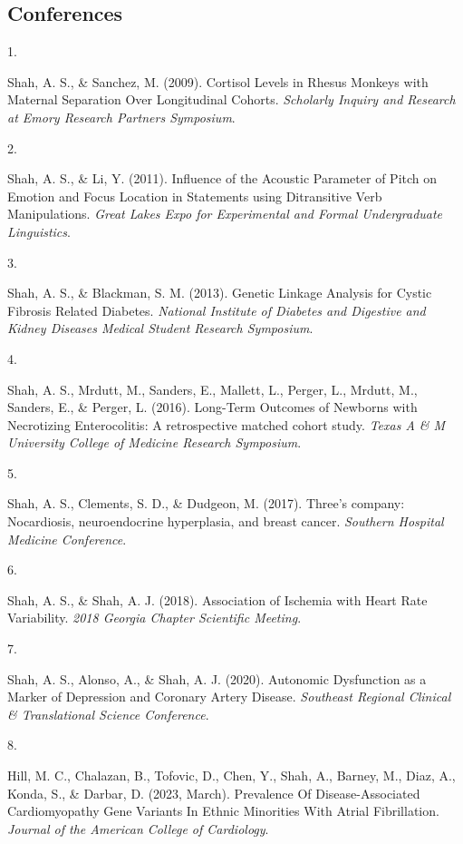 \documentclass[10pt,a4paper,]{article}
\newlength{\cslhangindent}
\newlength{\csllabelwidth}
\newenvironment{CSLReferences}[2] %
 {\begin{list}{}{%
  \setlength{\itemindent}{0pt}
  \setlength{\leftmargin}{0pt}
  \setlength{\parsep}{0pt}
  \ifodd #1
   \setlength{\leftmargin}{\cslhangindent}
   \setlength{\itemindent}{-1\cslhangindent}
  \fi
  \setlength{\itemsep}{#2\baselineskip}}}
 {\end{list}}
\newcommand{\CSLLeftMargin}[1]{\parbox[t]{\csllabelwidth}{\strut#1\strut}}
\newcommand{\CSLRightInline}[1]{\parbox[t]{\linewidth - \csllabelwidth}{\strut#1\strut}}
\begin{document}
\hypertarget{conferences}{%
\subsection{Conferences}\label{conferences}}

\hypertarget{refs-4fd2c6437df1f6e1a9355f0aa5a09fda}{}
\begin{CSLReferences}{0}{0}
\leavevmode{}%
\CSLLeftMargin{1. }%
\CSLRightInline{Shah, A. S., \& Sanchez, M. (2009). Cortisol Levels in
Rhesus Monkeys with Maternal Separation Over Longitudinal Cohorts.
\emph{Scholarly Inquiry and Research at Emory Research Partners
Symposium}.}

\leavevmode{}%
\CSLLeftMargin{2. }%
\CSLRightInline{Shah, A. S., \& Li, Y. (2011). Influence of the Acoustic
Parameter of Pitch on Emotion and Focus Location in Statements using
Ditransitive Verb Manipulations. \emph{Great Lakes Expo for Experimental
and Formal Undergraduate Linguistics}.}

\leavevmode{}%
\CSLLeftMargin{3. }%
\CSLRightInline{Shah, A. S., \& Blackman, S. M. (2013). Genetic Linkage
Analysis for Cystic Fibrosis Related Diabetes. \emph{National Institute
of Diabetes and Digestive and Kidney Diseases Medical Student Research
Symposium}.}

\leavevmode{}%
\CSLLeftMargin{4. }%
\CSLRightInline{Shah, A. S., Mrdutt, M., Sanders, E., Mallett, L.,
Perger, L., Mrdutt, M., Sanders, E., \& Perger, L. (2016). Long-Term
Outcomes of Newborns with Necrotizing Enterocolitis: A retrospective
matched cohort study. \emph{Texas A \& M University College of Medicine
Research Symposium}.}

\leavevmode{}%
\CSLLeftMargin{5. }%
\CSLRightInline{Shah, A. S., Clements, S. D., \& Dudgeon, M. (2017).
Three's company: Nocardiosis, neuroendocrine hyperplasia, and breast
cancer. \emph{Southern Hospital Medicine Conference}.}

\leavevmode{}%
\CSLLeftMargin{6. }%
\CSLRightInline{Shah, A. S., \& Shah, A. J. (2018). Association of
Ischemia with Heart Rate Variability. \emph{2018 Georgia Chapter
Scientific Meeting}.}

\leavevmode{}%
\CSLLeftMargin{7. }%
\CSLRightInline{Shah, A. S., Alonso, A., \& Shah, A. J. (2020).
Autonomic Dysfunction as a Marker of Depression and Coronary Artery
Disease. \emph{Southeast Regional Clinical \& Translational Science
Conference}.}

\leavevmode{}%
\CSLLeftMargin{8. }%
\CSLRightInline{Hill, M. C., Chalazan, B., Tofovic, D., Chen, Y., Shah,
A., Barney, M., Diaz, A., Konda, S., \& Darbar, D. (2023, March).
Prevalence Of Disease-Associated Cardiomyopathy Gene Variants In Ethnic
Minorities With Atrial Fibrillation. \emph{Journal of the American
College of Cardiology}.}

\end{CSLReferences}
\end{document}
